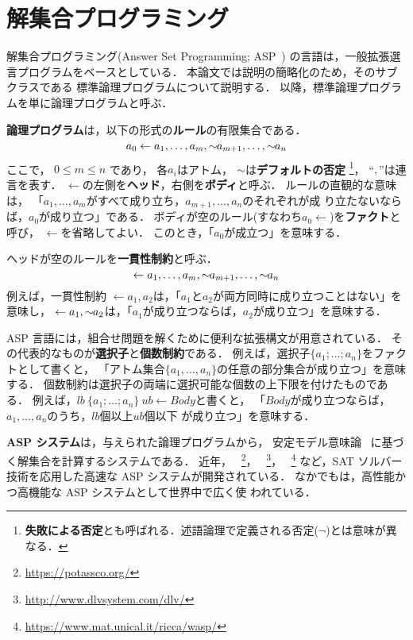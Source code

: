 \chapter{解集合プログラミング}\label{chap:asp}

解集合プログラミング(Answer Set Programming; ASP~\cite{%
  Baral03:cambridge,%
  Gelfond88:iclp,%
  Inoue08:jssst,%
  Niemela99:amai})
の言語は，一般拡張選言プログラムをベースとしている．
本論文では説明の簡略化のため，そのサブクラスである
標準論理プログラムについて説明する．
以降，標準論理プログラムを単に論理プログラムと呼ぶ．

\textbf{論理プログラム}は，以下の形式の\textbf{ルール}の有限集合である．
\begin{equation}
  \label{eq:rule}
  a_0\leftarrow a_1,\dots,a_m,{\sim\!\!{a_{m+1}}},\dots,{\sim\!\!{a_n}}
\end{equation}
ここで，
$0\leq m\leq n$ であり，
各$a_i$はアトム，
${\sim\!\!{}}$は\textbf{デフォルトの否定}
\footnote{\textbf{失敗による否定}とも呼ばれる．述語論理で定義される否定($\neg$)とは意味が異なる．}，
``$,$''は連言を表す．
$\leftarrow$の左側を\textbf{ヘッド}，右側を\textbf{ボディ}と呼ぶ．
ルールの直観的な意味は，
「$a_1,\ldots,a_m$がすべて成り立ち，$a_{m+1},\ldots,a_n$のそれぞれが成
り立たないならば，$a_0$が成り立つ」である．
ボディが空のルール(すなわち\(a_0\leftarrow\))を\textbf{ファクト}と呼び，
$\leftarrow$を省略してよい．
このとき，「$a_0$が成立つ」を意味する．

ヘッドが空のルールを\textbf{一貫性制約}と呼ぶ．
\begin{equation}
  \label{eq:constr}
  \leftarrow a_1,\dots,a_m,{\sim\!\!{a_{m+1}}},\dots,{\sim\!\!{a_n}}
\end{equation}
例えば，一貫性制約
\(\leftarrow a_1,a_2\)は，「$a_1$と$a_2$が両方同時に成り立つことはない」を意味し，
\(\leftarrow a_1, {\sim\!\!{a_{2}}}\)は，「$a_1$が成り立つならば，$a_2$が成り立つ」を意味する．

ASP 言語には，組合せ問題を解くために便利な拡張構文が用意されている．
その代表的なものが\textbf{選択子}と\textbf{個数制約}である．
例えば，選択子\(\{a_1;\dots;a_n\}\)をファクトとして書くと，
「アトム集合\(\{a_1,\dots,a_n\}\)の任意の部分集合が成り立つ」を意味する．
個数制約は選択子の両端に選択可能な個数の上下限を付けたものである．
例えば，\(lb\ \{a_1;\dots;a_n\}\ ub \leftarrow Body\)と書くと，
「$Body$が成り立つならば，$a_1,\dots,a_n$のうち，$lb$個以上$ub$個以下
が成り立つ」を意味する．

\textbf{ASP システム}は，与えられた論理プログラムから，
安定モデル意味論~\cite{Gelfond88:iclp}
に基づく解集合を計算するシステムである．
近年，
{\clingo}~\footnote{\url{https://potassco.org/}}，
{\dlv}~\footnote{\url{http://www.dlvsystem.com/dlv/}}，
{\wasp}~\footnote{\url{https://www.mat.unical.it/ricca/wasp/}}
など，SAT ソルバー技術を応用した高速な ASP システムが開発されている．
なかでも{\clingo}は，高性能かつ高機能な ASP システムとして世界中で広く使
われている．


